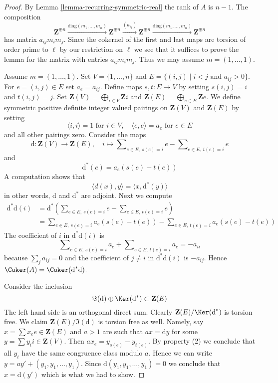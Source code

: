 \begin{proof}
By Lemma \ref{lemma-recurring-symmetric-real} the rank of $A$ is $n - 1$.
The composition
$$
\mathbf{Z}^{\oplus n} \xrightarrow{\text{diag}(m_1, \ldots, m_n)}
\mathbf{Z}^{\oplus n} \xrightarrow{(a_{ij})}
\mathbf{Z}^{\oplus n} \xrightarrow{\text{diag}(m_1, \ldots, m_n)}
\mathbf{Z}^{\oplus n}
$$
has matrix $a_{ij}m_im_j$. Since the cokernel of the first and last
maps are torsion of order prime to $\ell$ by our restriction on $\ell$
we see that it suffices to prove the lemma for the matrix
with entries $a_{ij}m_im_j$. Thus we may assume $m = (1, \ldots, 1)$.

\medskip\noindent
Assume $m = (1, \ldots, 1)$. Set $V = \{1, \ldots, n\}$ and
$E = \{(i, j) \mid i < j\text{ and }a_{ij}> 0\}$. For
$e = (i, j) \in E$ set $a_e = a_{ij}$. Define maps
$s, t : E \to V$ by setting $s(i, j) = i$ and $t(i, j) = j$.
Set
$\mathbf{Z}(V) = \bigoplus_{i \in V} \mathbf{Z}i$ and
$\mathbf{Z}(E) = \bigoplus_{e \in E} \mathbf{Z}e$.
We define symmetric positive definite integer valued pairings
on $\mathbf{Z}(V)$ and $\mathbf{Z}(E)$ by setting
$$
\langle i, i \rangle = 1\text{ for }i \in V, \quad
\langle e, e \rangle = a_e\text{ for }e \in E
$$
and all other pairings zero. Consider the maps
$$
\text{d} : \mathbf{Z}(V) \to \mathbf{Z}(E), \quad
i \longmapsto
\sum\nolimits_{e \in E,\ s(e) = i} e - \sum\nolimits_{e \in E,\ t(e) = i} e
$$
and
$$
\text{d}^*(e) = a_e(s(e) - t(e))
$$
A computation shows that
$$
\langle d(x), y\rangle = \langle x, \text{d}^*(y) \rangle
$$
in other words, $\text{d}$ and $\text{d}^*$ are adjoint. Next we compute
\begin{align*}
\text{d}^*\text{d}(i)
& = 
\text{d}^*(
\sum\nolimits_{e \in E,\ s(e) = i} e - \sum\nolimits_{e \in E,\ t(e) = i} e) \\
& =
\sum\nolimits_{e \in E,\ s(e) = i} a_e(s(e) - t(e)) -
\sum\nolimits_{e \in E,\ t(e) = i} a_e(s(e) - t(e))
\end{align*}
The coefficient of $i$ in $\text{d}^*\text{d}(i)$ is
$$
\sum\nolimits_{e \in E,\ s(e) = i} a_e +
\sum\nolimits_{e \in E,\ t(e) = i} a_e = - a_{ii}
$$
because $\sum_j a_{ij} = 0$ and the coefficient of
$j \not = i$ in $\text{d}^*\text{d}(i)$ is $-a_{ij}$.
Hence $\Coker(A) = \Coker(\text{d}^*\text{d})$.

\medskip\noindent
Consider the inclusion
$$
\Im(\text{d}) \oplus \Ker(\text{d}^*) \subset \mathbf{Z}(E)
$$
The left hand side is an orthogonal direct sum. Clearly
$\mathbf{Z}(E)/\Ker(\text{d}^*)$ is torsion free.
We claim $\mathbf{Z}(E)/\Im(\text{d})$ is torsion free as well.
Namely, say $x = \sum x_e e \in \mathbf{Z}(E)$ and $a > 1$ are such
that $ax = \text{d}y$ for some $y = \sum y_i i \in \mathbf{Z}(V)$.
Then $a x_e = y_{s(e)} - y_{t(e)}$. By property (2) we conclude
that all $y_i$ have the same congruence class modulo $a$.
Hence we can write $y = a y' + (y_1, y_1, \ldots, y_1)$.
Since $\text{d}(y_1, y_1, \ldots, y_1) = 0$ we conclude
that $x = \text{d}(y')$ which is what we had to show.


\end{proof}
